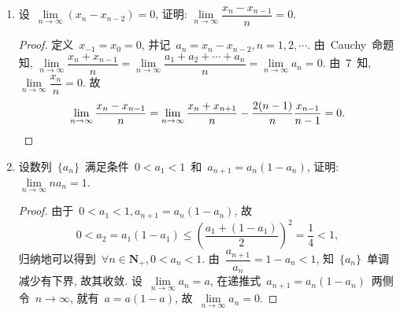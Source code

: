 \documentclass[UTF8,a4paper,11pt,twoside]{book}
\begin{document}
\begin{enumerate}
	\item 设~$\lim\limits_{n\to\infty} (x_n-x_{n-2})=0$, 证明: $\lim\limits_{n\to\infty} \dfrac{x_n-x_{n-1}}{n}=0$.
	      \begin{proof}
		      定义~$x_{-1}=x_0=0$, 并记~$a_n=x_n-x_{n-2}, n=1,2,\cdots$. 由~Cauchy~命题知, $\lim\limits_{n\to\infty} \dfrac{x_n+x_{n-1}}{n}=\lim\limits_{n\to\infty} \dfrac{a_1+a_2+\cdots+a_n}{n}=\lim\limits_{n\to\infty} a_n=0$. 由~7~知, $\lim\limits_{n\to\infty} \dfrac{x_n}{n}=0$. 故
		      \[
			      \lim\limits_{n\to\infty} \dfrac{x_n-x_{n-1}}{n}=\lim\limits_{n\to\infty} \dfrac{x_n+x_{n+1}}{n}-\dfrac{2(n-1)}{n}\dfrac{x_{n-1}}{n-1}=0.\qedhere
		      \]
	      \end{proof}
	\item 设数列~$\{a_n\}$~满足条件~$0<a_1<1$~和~$a_{n+1}=a_n(1-a_n)$, 证明: $\lim\limits_{n\to\infty} na_n=1$.
	      \begin{proof}
		      由于~$0<a_1<1, a_{n+1}=a_n(1-a_n)$, 故
		      \[
			      0<a_2=a_1(1-a_1)\leqslant\left(\dfrac{a_1+(1-a_1)}{2}\right)^2=\dfrac{1}{4}<1,
		      \]
		      归纳地可以得到~$\forall n\in\mathbf{N}_{+}, 0<a_n<1$. 由~$\dfrac{a_{n+1}}{a_n}=1-a_n<1$, 知~$\{a_n\}$~单调减少有下界, 故其收敛. 设~$\lim\limits_{n\to\infty} a_n=a$, 在递推式~$a_{n+1}=a_n(1-a_n)$~两侧令~$n\to\infty$, 就有~$a=a(1-a)$, 故~$\lim\limits_{n\to\infty} a_n=0$.


\end{proof}
\end{enumerate}
\end{document}
